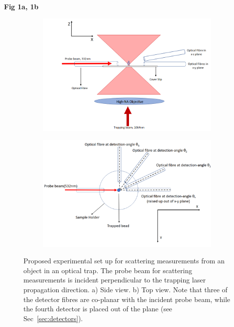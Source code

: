 \documentclass[final,  3p]{elsarticle}
\begin{document}
\begin{center}
		{\bf{Fig 1a, 1b}}
\end{center}
\begin{figure} [b]
\centering
\begin{subfigure}{0.45\textwidth}
	\subcaption{}
	\includegraphics[width=\textwidth, height=0.25\textheight]{./Images/fig1a.png}
\end{subfigure}
\begin{subfigure}{0.45\textwidth}
	\subcaption{}
	\includegraphics[width=\textwidth, height=0.25\textheight]{./Images/fig1b.png}
\end{subfigure}
\caption{\label{fig:setup}
  Proposed experimental set up for scattering measurements from an object in an optical trap. The probe beam for scattering measurements is incident perpendicular to the trapping laser propagation direction. a) Side view. b) Top view. Note that three of the detector fibres are co-planar with the incident probe beam, while the fourth detector is placed out of the plane (see Sec~\ref{sec:detectors}).
%
}
\end{figure}
\end{document}
